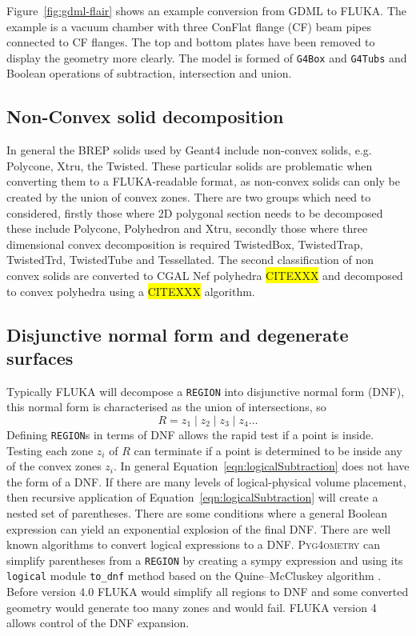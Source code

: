 \documentclass[final,5p,times,twocolumn]{elsarticle}
\newcommand{\PYGEOMETRY}{\textsc{Pyg4ometry}}
\begin{document}
Figure~\ref{fig:gdml-flair} shows an example conversion from GDML to FLUKA. The example is a 
vacuum chamber with three ConFlat flange (CF) beam pipes connected to CF flanges. The top and bottom plates 
have been removed to display the geometry more clearly. The model is formed of \verb|G4Box| and
\verb|G4Tubs| and Boolean operations of subtraction, intersection and union.

\subsection{Non-Convex solid decomposition}
In general the BREP solids used by Geant4 include non-convex solids, e.g. Polycone, Xtru, the Twisted.  These 
particular solids are problematic when converting them to a FLUKA-readable format, as non-convex solids 
can only be created by the union of convex zones. There are two groups which need to considered, firstly those 
where 2D polygonal section needs to be decomposed these include Polycone, Polyhedron and Xtru, secondly 
those where three dimensional convex decomposition is required  TwistedBox, TwistedTrap, TwistedTrd, 
TwistedTube and Tessellated. The second classification of non convex solids are converted to CGAL 
Nef polyhedra \colorbox{yellow}{CITEXXX} and decomposed to convex polyhedra using a 
\colorbox{yellow}{CITEXXX} algorithm. 

\subsection{Disjunctive normal form and degenerate surfaces}
Typically FLUKA will decompose a \verb|REGION| into disjunctive normal form (DNF), this normal form is 
characterised as the union of intersections, so 
\begin{equation}
R = z_1 \; | \;z_2\;  | \; z_3 	\; | \; z_4 \dots
\end{equation}
Defining \verb|REGION|s in terms of DNF allows the rapid test if a point is inside. Testing each zone 
$z_i$ of $R$ can terminate if a point is determined to be inside any of the convex zones $z_i$. In general 
Equation~\ref{eqn:logicalSubtraction} does not have the form of a DNF. If there are many levels of logical-physical volume 
placement, then recursive application of  Equation~\ref{eqn:logicalSubtraction} will create a nested set of 
parentheses. There are some conditions where a general Boolean expression can yield an exponential 
explosion of the final DNF. There are well known algorithms to convert logical expressions to a DNF. 
\PYGEOMETRY{} can simplify parentheses from a \verb|REGION| by creating a sympy \cite{10.7717/peerj-cs.103} 
expression and using its \verb|logical| module \verb|to_dnf| method based on the Quine–McCluskey algorithm \cite{6769983}. 
Before version 4.0 FLUKA  would simplify all regions to DNF and some converted geometry would generate 
too many zones and would fail. FLUKA version 4 allows control of the DNF expansion.
\end{document}
